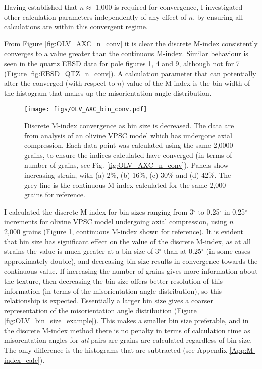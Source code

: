 \documentclass[a4paper,12pt,twoside]{report}
\numberwithin{equation}{chapter}
\begin{document}
Having established that $n \approx$ 1,000 is required for convergence, I investigated other calculation parameters independently of any effect of $n$, by ensuring all calculations are within this convergent regime. 

From Figure \ref{fig:OLV_AXC_n_conv} it is clear the discrete M-index consistently converges to a value greater than the continuous M-index. Similar behaviour is seen in the quartz EBSD data for pole figures 1, 4 and 9, although not for 7 (Figure \ref{fig:EBSD_QTZ_n_conv}). A calculation parameter that can potentially alter the converged (with respect to $n$) value of the M-index is the bin width of the histogram that makes up the misorientation angle distribution.   

\begin{figure}[h!]
  \centering
    \texttt{[image: figs/OLV\_AXC\_bin\_conv.pdf]}
  \caption[Convergence with bin size (olivine)]{Discrete M-index convergence as bin size is decreased. The data are from analysis of an olivine VPSC model which has undergone axial compression. Each data point was calculated using the same 2,0000 grains, to ensure the indices calculated have converged (in terms of number of grains, see Fig. \ref{fig:OLV_AXC_n_conv}). Panels show increasing strain, with (a) 2\%, (b) 16\%, (c) 30\% and (d) 42\%. The grey line is the continuous M-index calculated for the same 2,000 grains for reference.}
  \label{fig:OLV_AXC_b_conv}
\end{figure}  

I calculated the discrete M-index for bin sizes ranging from 3$^\circ$ to 0.25$^\circ$ in 0.25$^\circ$ increments for olivine VPSC model undergoing axial compression, using $n$ = 2,000 grains (Figure \ref{fig:OLV_AXC_b_conv}, continuous M-index shown for reference). It is evident that bin size has significant effect on the value of the discrete M-index, as at all strains the value is much greater at a bin size of 3$^\circ$ than at 0.25$^\circ$ (in some cases approximately double), and decreasing bin size results in convergence towards the continuous value. If increasing the number of grains gives more information about the texture, then decreasing the bin size offers better resolution of this information (in terms of the misorientation angle distribution), so this relationship is expected. Essentially a larger bin size gives a coarser representation of the misorientation angle distribution (Figure \ref{fig:OLV_bin_size_example}). This makes a smaller bin size preferable, and in the discrete M-index method there is no penalty in terms of calculation time as misorentation angles for \emph{all} pairs are grains are calculated regardless of bin size. The only difference is the histograms that are subtracted (see Appendix \ref{App:M-index_calc}).
\end{document}
